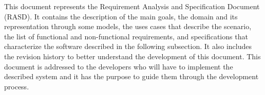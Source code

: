 This document represents the Requirement Analysis and Specification Document (RASD).
It contains the description of the main goals, the domain and its representation through some models, the uses cases that describe the scenario, the list of functional and non-functional requirements, and specifications that characterize the software described in the following subsection.
It also includes the revision history to better understand the development of this document.
This document is addressed to the developers who will have to implement the described system and it has the purpose to guide them through the development process.